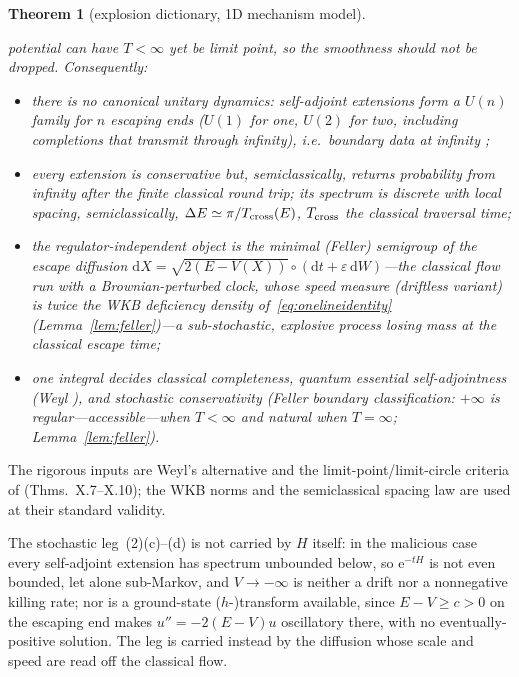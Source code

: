 \documentclass[11pt]{article}
\newtheorem{theorem}{Theorem}[section]
\theoremstyle{definition}
\theoremstyle{remark}
\newcommand{\dd}{\mathrm{d}}
\newcommand{\ee}{\mathrm{e}}
\begin{document}
\begin{theorem}[explosion dictionary, 1D mechanism model]
\begin{itemize}
potential can have $T<\infty$ yet be limit point, so the smoothness
should not be dropped.
Consequently:
\begin{itemize}
\item[(a)] there is no canonical unitary dynamics: self-adjoint extensions
form a $U(n)$ family for $n$ escaping ends ($U(1)$ for one, $U(2)$ for two, including
completions that transmit through infinity), i.e.\ boundary data at
infinity \cite{ReedSimon2};
\item[(b)] every extension is conservative but, semiclassically, returns
probability from infinity after the finite classical round trip; its spectrum is discrete
with local spacing, semiclassically,
$\Delta E\simeq\pi/T_{\rm cross}(E)$, $T_{\rm cross}$ the
classical traversal time;
\item[(c)] the regulator-independent object is the minimal (Feller)
semigroup \cite{Feller1952} of the \emph{escape diffusion}
$\dd X=\sqrt{2(E-V(X))}\circ(\dd t+\varepsilon\,\dd W)$---the classical flow
run with a Brownian-perturbed clock, whose speed measure (driftless variant) is twice the WKB
deficiency density of~\eqref{eq:onelineidentity} (Lemma~\ref{lem:feller})---a
sub-stochastic, \emph{explosive} process losing mass at the classical escape
time;
\item[(d)] one integral decides classical completeness, quantum essential
self-adjointness (Weyl \cite{Weyl1910}), and stochastic conservativity
(Feller boundary classification: $+\infty$ is regular---accessible---when
$T<\infty$ and natural when $T=\infty$; Lemma~\ref{lem:feller}).
\end{itemize}
\end{itemize}
\end{theorem}

The rigorous inputs are Weyl's alternative and the limit-point/limit-circle
criteria of \cite{CoddingtonLevinson,ReedSimon2} (Thms.~X.7--X.10); the WKB norms and the
semiclassical spacing law are used at their standard validity.

The stochastic leg~(2)(c)--(d) is not carried by $H$ itself: in the
malicious case every self-adjoint extension has spectrum unbounded below, so
$\ee^{-tH}$ is not even bounded, let alone sub-Markov, and $V\to-\infty$ is
neither a drift nor a nonnegative killing rate; nor is a ground-state
($h$-)transform available, since $E-V\ge c>0$ on the escaping end makes
$u''=-2(E-V)u$ oscillatory there, with no eventually-positive solution. The
leg is carried instead by the diffusion whose scale and speed are read off
the classical flow.
\end{document}
